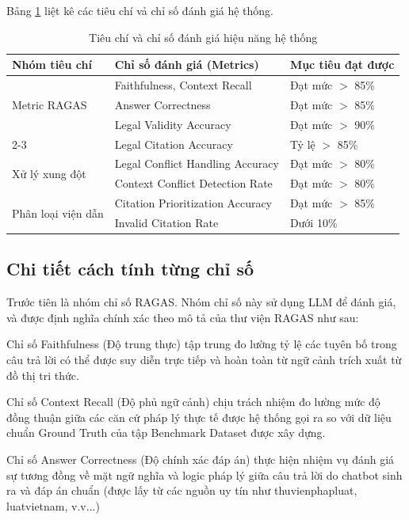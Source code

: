 \documentclass[../DoAn.tex]{subfiles}
\begin{document}
Bảng \ref{table:testing_metrics} liệt kê các tiêu chí vả chỉ số đánh giá hệ thống.
\begin{table}[H]
\centering
\caption{Tiêu chí và chỉ số đánh giá hiệu năng hệ thống}
\label{table:testing_metrics}
\begin{tabular}{|l|l|p{4cm}|}
\hline
\textbf{Nhóm tiêu chí} & \textbf{Chỉ số đánh giá (Metrics)} & \textbf{Mục tiêu đạt được} \\ \hline
\multirow{3}{*}{Metric RAGAS} & Faithfulness, Context Recall & Đạt mức $>$ 85\%  \\ \cline{2-3} 
 & Answer Correctness & Đạt mức $>$ 85\% \\ \hline
\multirow{2}{*}{Căn cứ pháp lý} & Legal Validity Accuracy & Đạt mức $>$ 90\% \\ \cline{2-3} 
 & Legal Citation Accuracy & Tỷ lệ $>$ 85\% \\ \hline
\multirow{2}{*}{Xử lý xung đột} & Legal Conflict Handling Accuracy & Đạt mức $>$ 80\% \\ \cline{2-3} 
 & Context Conflict Detection Rate & Đạt mức $>$ 80\% \\ \hline
\multirow{2}{*}{Phân loại viện dẫn} & Citation Prioritization Accuracy & Đạt mức $>$ 85\% \\ \cline{2-3} 
 & Invalid Citation Rate & Dưới 10\%  \\ \hline
\end{tabular}
\end{table}

\subsection{Chi tiết cách tính từng chỉ số}
\label{subsection:5.2.2}

Trước tiên là nhóm chỉ số RAGAS. Nhóm chỉ số này sử dụng LLM để đánh giá, và được định nghĩa chính xác theo mô tả của thư viện RAGAS như sau:

Chỉ số Faithfulness (Độ trung thực) tập trung đo lường tỷ lệ các tuyên bố trong câu trả lời có thể được suy diễn trực tiếp và hoàn toàn từ ngữ cảnh trích xuất từ đồ thị tri thức.

Chỉ số Context Recall (Độ phủ ngữ cảnh) chịu trách nhiệm đo lường mức độ đồng thuận giữa các căn cứ pháp lý thực tế được hệ thống gọi ra so với dữ liệu chuẩn Ground Truth của tập Benchmark Dataset được xây dựng.

Chỉ số Answer Correctness (Độ chính xác đáp án) thực hiện nhiệm vụ đánh giá sự tương đồng về mặt ngữ nghĩa và logic pháp lý giữa câu trả lời do chatbot sinh ra và đáp án chuẩn (được lấy từ các nguồn uy tín như thuvienphapluat, luatvietnam, v.v...)
\end{document}
